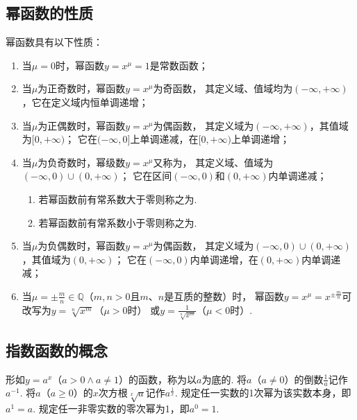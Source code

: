 \subsection{幂函数的性质}
\begin{property}
幂函数具有以下性质：
\begin{enumerate}
\item 当\(\mu = 0\)时，幂函数\(y=x^{\mu}=1\)是常数函数；

\item 当\(\mu\)为正奇数时，幂函数\(y=x^{\mu}\)为奇函数，%
其定义域、值域均为\((-\infty,+\infty)\)，它在定义域内恒单调递增；

\item 当\(\mu\)为正偶数时，幂函数\(y=x^{\mu}\)为偶函数，%
其定义域为\((-\infty,+\infty)\)，其值域为\([0,+\infty)\)；
它在\((-\infty,0]\)上单调递减，在\([0,+\infty)\)上单调递增；

\item 当\(\mu\)为负奇数时，幂级数\(y=x^{\mu}\)又称为，%
其定义域、值域为\((-\infty,0)\cup(0,+\infty)\)；
它在区间\((-\infty,0)\)和\((0,+\infty)\)内单调递减；
\begin{enumerate}
	\item 若幂函数前有常系数大于零则称之为.
	\item 若幂函数前有常系数小于零则称之为.
\end{enumerate}

\item 当\(\mu\)为负偶数时，幂函数\(y=x^{\mu}\)为偶函数，%
其定义域为\((-\infty,0)\cup(0,+\infty)\)，其值域为\((0,+\infty)\)；
它在\((-\infty,0)\)内单调递增，在\((0,+\infty)\)内单调递减；

\item 当\(\mu = \pm\frac{m}{n} \in \mathbb{Q}\)（\(m,n>0\)且\(m\)、\(n\)是互质的整数）时，%
幂函数\(y=x^{\mu}=x^{\pm\frac{m}{n}}\)可改写为\(y=\sqrt[n]{x^m}\)（\(\mu>0\)时）%
或\(y=\frac{1}{\sqrt[n]{x^m}}\)（\(\mu<0\)时）.
\end{enumerate}
\end{property}

\subsection{指数函数的概念}
\begin{definition}[指数函数]
形如\(y=a^x\)（\(a>0 \land a \neq 1\)）的函数，称为以\(a\)为底的.
将\(a\)（\(a \neq 0\)）的倒数\(\frac{1}{a}\)记作\(a^{-1}\).
将\(a\)（\(a \geq 0\)）的\(x\)次方根\(\sqrt[x]{a}\)记作\(a^{\frac{1}{x}}\).
规定任一实数的1次幂为该实数本身，即\(a^1=a\).
规定任一非零实数的零次幂为1，即\(a^0=1\).
\end{definition}

